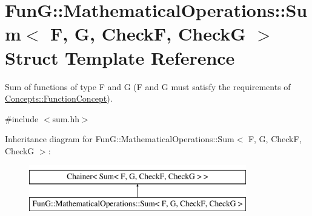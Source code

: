 \hypertarget{structFunG_1_1MathematicalOperations_1_1Sum}{}\section{Fun\+G\+:\+:Mathematical\+Operations\+:\+:Sum$<$ F, G, Check\+F, Check\+G $>$ Struct Template Reference}
\label{structFunG_1_1MathematicalOperations_1_1Sum}


Sum of functions of type F and G (F and G must satisfy the requirements of \hyperlink{structFunG_1_1Concepts_1_1FunctionConcept}{Concepts\+::\+Function\+Concept}).  




{\ttfamily \#include $<$sum.\+hh$>$}

Inheritance diagram for Fun\+G\+:\+:Mathematical\+Operations\+:\+:Sum$<$ F, G, Check\+F, Check\+G $>$\+:\begin{figure}[H]
\begin{center}
\leavevmode
\includegraphics[height=2.000000cm]{structFunG_1_1MathematicalOperations_1_1Sum}
\end{center}
\end{figure}
